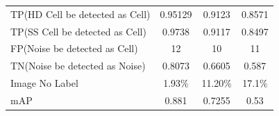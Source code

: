 \begin{table}[b]
{\begin{tabular}{@{}lccc@{}}
TP(HD Cell be detected as Cell)                & 0.95129                                                                                                             & 0.9123                                                                                                                              & 0.8571                                                                                                                                                            \\
TP(SS Cell be detected as Cell)                & 0.9738                                                                                                              & 0.9117                                                                                                                              & 0.8497                                                                                                                                                            \\
FP(Noise be detected as Cell)                  & 12                                                                                                                  & 10                                                                                                                                  & 11                                                                                                                                                                \\
TN(Noise be detected as Noise)                 & 0.8073                                                                                                              & 0.6605                                                                                                                              & 0.587                                                                                                                                                             \\
Image No Label                                 & 1.93\%                                                                                                              & 11.20\%                                                                                                                             & 17.1\%                                                                                                                                                            \\
mAP                                            & 0.881                                                                                                               & 0.7255                                                                                                                              & 0.53                                                                                                                                                              \\

\end{tabular}}
\end{table}
